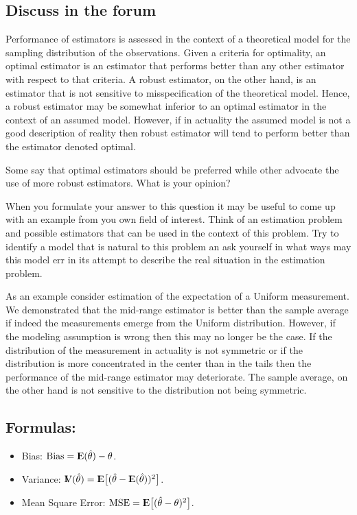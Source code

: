 \documentclass[]{krantz}
\newcommand{\Expec}{{\rm I\kern-.3em E}}
\newcommand{\Var}{{\rm I\kern-.3em V}}
\theoremstyle{definition}
\theoremstyle{definition}
\theoremstyle{definition}
\theoremstyle{remark}
\begin{document}
\hypertarget{discuss-in-the-forum}{%
\subsection*{Discuss in the forum}\label{discuss-in-the-forum}}


Performance of estimators is assessed in the context of a theoretical
model for the sampling distribution of the observations. Given a
criteria for optimality, an optimal estimator is an estimator that
performs better than any other estimator with respect to that criteria.
A robust estimator, on the other hand, is an estimator that is not
sensitive to misspecification of the theoretical model. Hence, a robust
estimator may be somewhat inferior to an optimal estimator in the
context of an assumed model. However, if in actuality the assumed model
is not a good description of reality then robust estimator will tend to
perform better than the estimator denoted optimal.

Some say that optimal estimators should be preferred while other
advocate the use of more robust estimators. What is your opinion?

When you formulate your answer to this question it may be useful to come
up with an example from you own field of interest. Think of an
estimation problem and possible estimators that can be used in the
context of this problem. Try to identify a model that is natural to this
problem an ask yourself in what ways may this model err in its attempt
to describe the real situation in the estimation problem.

As an example consider estimation of the expectation of a Uniform
measurement. We demonstrated that the mid-range estimator is better than
the sample average if indeed the measurements emerge from the Uniform
distribution. However, if the modeling assumption is wrong then this may
no longer be the case. If the distribution of the measurement in
actuality is not symmetric or if the distribution is more concentrated
in the center than in the tails then the performance of the mid-range
estimator may deteriorate. The sample average, on the other hand is not
sensitive to the distribution not being symmetric.

\hypertarget{formulas}{%
\subsection*{Formulas:}\label{formulas}}


\begin{itemize}
\item
  Bias: \(\mathrm{Bias} = \Expec(\hat \theta) - \theta\).
\item
  Variance:
  \(\Var(\hat \theta) = \Expec\big[(\hat \theta - \Expec(\hat\theta))^2\big]\).
\item
  Mean Square Error:
  \(\mathrm{MSE} = \Expec\big[(\hat \theta - \theta)^2\big]\).
\end{itemize}
\end{document}
